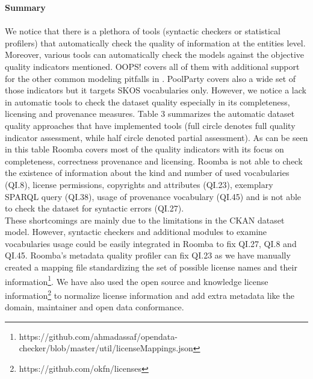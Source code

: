 \documentclass[onecolumn, crcready]{iosart2c}
\begin{document}
\noindent

\textbf{Summary}
\indent \\\\
\indent We notice that there is a plethora of tools (syntactic checkers or statistical profilers) that automatically check the quality of information at the entities level. Moreover, various tools can automatically check the models against the objective quality indicators mentioned. OOPS! covers all of them with additional support for the other common modeling pitfalls in \cite{DBLP:conf/ic3k/KeetSP13}. PoolParty covers also a wide set of those indicators but it targets SKOS vocabularies only. However, we notice a lack in automatic tools to check the dataset quality especially in its completeness, licensing and provenance measures. Table 3 summarizes the automatic dataset quality approaches that have implemented tools (full circle denotes full quality indicator assessment, while half circle denoted partial assessment). As can be seen in this table Roomba covers most of the quality indicators with its focus on completeness, correctness provenance and licensing. Roomba is not able to check the existence of information about the kind and number of used vocabularies (QI.8), license permissions, copyrights and attributes (QI.23), exemplary SPARQL query (QI.38), usage of provenance vocabulary (QI.45) and is not able to check the dataset for syntactic errors (QI.27).\\These shortcomings are mainly due to the limitations in the CKAN dataset model. However, syntactic checkers and additional modules to examine vocabularies usage could be easily integrated in Roomba to fix QI.27, QI.8 and QI.45. Roomba's metadata quality profiler can fix QI.23 as we have manually created a mapping file standardizing the set of possible license names and their information\footnote{https://github.com/ahmadassaf/opendata-checker/blob/master/util/licenseMappings.json}. We have also used the open source and knowledge license information\footnote{https://github.com/okfn/licenses} to normalize license information and add extra metadata like the domain, maintainer and open data conformance.
\end{document}
